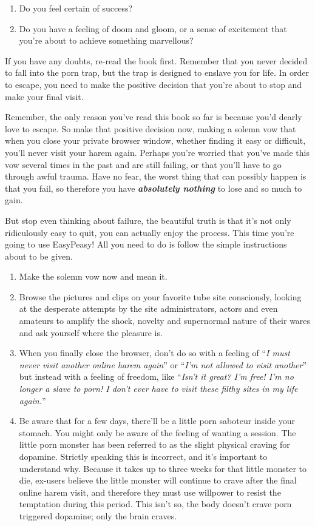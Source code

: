 \documentclass[
]{book}
\begin{document}
\begin{enumerate}
\def\labelenumi{\arabic{enumi}.}
\item
  Do you feel certain of success?
\item
  Do you have a feeling of doom and gloom, or a sense of excitement that you're about to achieve something marvellous?
\end{enumerate}

If you have any doubts, re-read the book first. Remember that you never decided to fall into the porn trap, but the trap is designed to enslave you for life. In order to escape, you need to make the positive decision that you're about to stop and make your final visit.

Remember, the only reason you've read this book so far is because you'd dearly love to escape. So make that positive decision now, making a solemn vow that when you close your private browser window, whether finding it easy or difficult, you'll never visit your harem again. Perhaps you're worried that you've made this vow several times in the past and are still failing, or that you'll have to go through awful trauma. Have no fear, the worst thing that can possibly happen is that you fail, so therefore you have \textbf{\emph{absolutely nothing}} to lose and so much to gain.

But stop even thinking about failure, the beautiful truth is that it's not only ridiculously easy to quit, you can actually enjoy the process. This time you're going to use EasyPeasy! All you need to do is follow the simple instructions about to be given.

\begin{enumerate}
\def\labelenumi{\arabic{enumi}.}
\item
  Make the solemn vow now and mean it.
\item
  Browse the pictures and clips on your favorite tube site consciously, looking at the desperate attempts by the site administrators, actors and even amateurs to amplify the shock, novelty and supernormal nature of their wares and ask yourself where the pleasure is.
\item
  When you finally close the browser, don't do so with a feeling of ``\emph{I must never visit another online harem again}'' or ``\emph{I'm not allowed to visit another}'' but instead with a feeling of freedom, like ``\emph{Isn't it great? I'm free! I'm no longer a slave to porn! I don't ever have to visit these filthy sites in my life again.}''
\item
  Be aware that for a few days, there'll be a little porn saboteur inside your stomach. You might only be aware of the feeling of wanting a session. The little porn monster has been referred to as the slight physical craving for dopamine. Strictly speaking this is incorrect, and it's important to understand why. Because it takes up to three weeks for that little monster to die, ex-users believe the little monster will continue to crave after the final online harem visit, and therefore they must use willpower to resist the temptation during this period. This isn't so, the body doesn't crave porn triggered dopamine; only the brain craves.
\end{enumerate}
\end{document}
